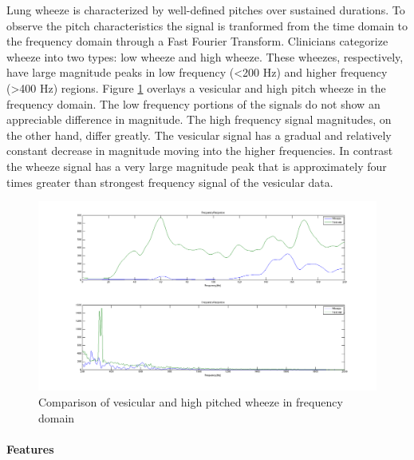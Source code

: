 \documentclass{article}
\begin{document}
Lung wheeze is characterized by well-defined pitches over sustained durations. To observe the pitch characteristics the signal is tranformed from the time domain to the frequency domain through a Fast Fourier Transform. Clinicians categorize wheeze into two types: low wheeze and high wheeze. These wheezes, respectively, have large magnitude peaks in low frequency (<200 Hz) and higher frequency (>400 Hz) regions. Figure \ref{fig:FFTVesicularWheeze} overlays a vesicular and high pitch wheeze in the frequency domain. The low frequency portions of the signals do not show an appreciable difference in magnitude. The high frequency signal magnitudes, on the other hand, differ greatly. The vesicular signal has a gradual and relatively constant decrease in magnitude moving into the higher frequencies. In contrast the wheeze signal has a very large magnitude peak that is approximately four times greater than strongest frequency signal of the vesicular data. \\

\begin{figure}[H]
	\includegraphics[width=\linewidth]{images/FFTVesicularWheeze.png}
	\caption{Comparison of vesicular and high pitched wheeze in frequency domain}
 	\label{fig:FFTVesicularWheeze}
\end{figure}

\paragraph{Features}
\end{document}
